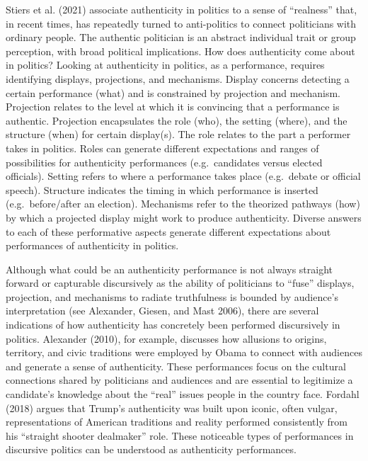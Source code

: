 \documentclass[
  12pt,
]{article}
\begin{document}
Stiers et al. (2021) associate authenticity in politics to a sense of
``realness'' that, in recent times, has repeatedly turned to
anti-politics to connect politicians with ordinary people. The authentic
politician is an abstract individual trait or group perception, with
broad political implications. How does authenticity come about in
politics? Looking at authenticity in politics, as a performance,
requires identifying displays, projections, and mechanisms. Display
concerns detecting a certain performance (what) and is constrained by
projection and mechanism. Projection relates to the level at which it is
convincing that a performance is authentic. Projection encapsulates the
role (who), the setting (where), and the structure (when) for certain
display(s). The role relates to the part a performer takes in politics.
Roles can generate different expectations and ranges of possibilities
for authenticity performances (e.g.~candidates versus elected
officials). Setting refers to where a performance takes place
(e.g.~debate or official speech). Structure indicates the timing in
which performance is inserted (e.g.~before/after an election).
Mechanisms refer to the theorized pathways (how) by which a projected
display might work to produce authenticity. Diverse answers to each of
these performative aspects generate different expectations about
performances of authenticity in politics.

Although what could be an authenticity performance is not always
straight forward or capturable discursively as the ability of
politicians to ``fuse'' displays, projection, and mechanisms to radiate
truthfulness is bounded by audience's interpretation (see Alexander,
Giesen, and Mast 2006), there are several indications of how
authenticity has concretely been performed discursively in politics.
Alexander (2010), for example, discusses how allusions to origins,
territory, and civic traditions were employed by Obama to connect with
audiences and generate a sense of authenticity. These performances focus
on the cultural connections shared by politicians and audiences and are
essential to legitimize a candidate's knowledge about the ``real''
issues people in the country face. Fordahl (2018) argues that Trump's
authenticity was built upon iconic, often vulgar, representations of
American traditions and reality performed consistently from his
``straight shooter dealmaker'' role. These noticeable types of
performances in discursive politics can be understood as authenticity
performances.
\end{document}
